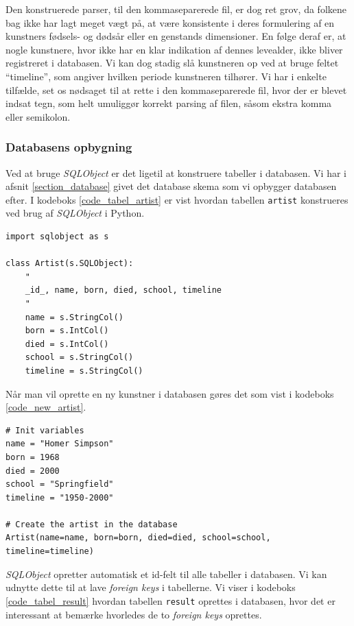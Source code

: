 {Den konstruerede parser, til den kommaseparerede fil, er dog ret grov,
da folkene bag \cite{wgahu} ikke har lagt meget vægt på, at være
konsistente i deres formulering af en kunstners fødsels- og dødsår eller
en genstands dimensioner. En følge deraf er, at nogle kunstnere, hvor
\cite{wgahu} ikke har en klar indikation af dennes levealder, ikke
bliver registreret i databasen. Vi kan dog stadig slå kunstneren op ved
at bruge feltet ``timeline'', som angiver hvilken periode kunstneren
tilhører. Vi har i enkelte tilfælde, set os nødsaget til at rette i den
kommaseparerede fil, hvor der er blevet indsat tegn, som helt umuliggør
korrekt parsing af filen, såsom ekstra komma eller semikolon.

\subsubsection{Databasens opbygning}
Ved at bruge \emph{SQLObject} er det ligetil at konstruere tabeller i
databasen. Vi har i afsnit \ref{section_database} givet det database
skema som vi opbygger databasen efter. I kodeboks
\ref{code_tabel_artist} er vist hvordan tabellen \texttt{artist}
konstrueres ved brug af \emph{SQLObject} i Python.

\begin{lstlisting}[caption={Pythonkode for oprettelse af tabeller i
    databasen.}, captionpos=b, label={code_tabel_artist}, frame=tb,
    breaklines=false, float=hb]
import sqlobject as s

class Artist(s.SQLObject):
    "
    _id_, name, born, died, school, timeline
    "
    name = s.StringCol()
    born = s.IntCol()
    died = s.IntCol()
    school = s.StringCol()
    timeline = s.StringCol()
\end{lstlisting}

Når man vil oprette en ny kunstner i databasen gøres det som vist
i kodeboks \ref{code_new_artist}.

\begin{lstlisting}[caption={Oprettelse af en kunstner i databasen.},
    captionpos=b, label={code_new_artist}, frame=tb, breaklines=false,
    float=h]
# Init variables
name = "Homer Simpson"
born = 1968
died = 2000
school = "Springfield"
timeline = "1950-2000"

# Create the artist in the database
Artist(name=name, born=born, died=died, school=school, timeline=timeline)
\end{lstlisting}

\emph{SQLObject} opretter automatisk et id-felt til alle tabeller i
databasen. Vi kan udnytte dette til at lave \emph{foreign keys} i
tabellerne. Vi viser i kodeboks \ref{code_tabel_result} hvordan tabellen
\texttt{result} oprettes i databasen, hvor det er interessant at bemærke
hvorledes de to \emph{foreign keys} oprettes.

}
